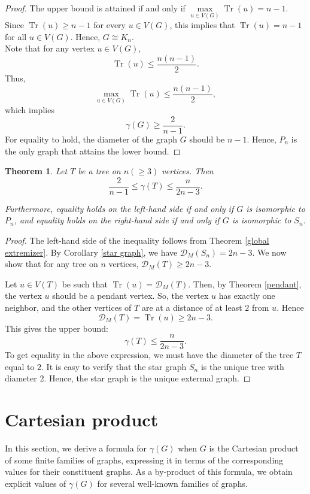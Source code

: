 \documentclass[12pt]{article}
\newtheorem{theorem}{Theorem}[section]
\DeclareMathOperator{\tr}{Tr}
\begin{document}
{{\begin{proof}
				The upper bound is attained if and only if $\max\limits_{u\in V(G)} \tr(u)=n-1$. Since $\tr(u) \geq n-1$ for every $u \in V(G)$, this implies that $\tr(u) = n-1$ for all $u \in V(G)$. Hence, $G \cong K_n$.\\
				Note that for any vertex $u \in V(G)$,
				$$
				\tr(u) \leq \frac{n(n-1)}{2}.
				$$
				Thus, $$\max\limits_{u \in V(G)} \tr(u) \leq \frac{n(n-1)}{2},$$ which implies  $$\gamma(G) \geq \frac{2}{n-1}.$$
				For equality to hold, the diameter of the graph $G$ should be $n-1$. Hence, $P_n$ is the only graph that attains the lower bound.
			\end{proof}
			
			\begin{theorem}
				Let $T$ be a tree on $n(\geq 3)$ vertices.
				Then 
				$$\frac{2}{n-1} \leq \gamma(T) \leq \frac{n}{2n-3}.$$
				
				Furthermore,  equality holds on the left-hand side if and only if  $G$ is isomorphic to $P_n$, and equality holds on the right-hand side if and only if  $G$ is isomorphic to $S_n$.
			\end{theorem}
			\begin{proof}
				The left-hand side of the inequality follows from Theorem \ref{global extremizer}. By Corollary \ref{star graph}, we have $\mathcal{D}_M(S_n)=2n-3$. We now show that for any tree on $n$ vertices, $\mathcal{D}_M(T) \geq 2n-3$. 
				
				Let $u \in V(T)$ be such that $\tr(u)=\mathcal{D}_M(T)$. Then, by Theorem \ref{pendant}, the vertex $u$ should be a pendant vertex. So, the vertex $u$ has exactly one neighbor, and the other vertices of $T$ are at a distance of at least $2$ from $u$. Hence
				$$
				\mathcal{D}_M(T)=\tr(u)\geq 2n-3.
				$$
				This gives the upper bound: $$\gamma (T) \leq \frac{n}{2n-3}.$$
				To get equality in the above expression, we must have the diameter of the tree $T$ equal to $2$. It is easy to verify that the star graph $S_n$ is the unique tree with diameter $2$. Hence, the star graph is the unique extermal graph.
			\end{proof}
			\section{Cartesian product}\label{sec-product}
			
			
			In this section, we derive a formula for $\gamma(G)$ when $G$ is the Cartesian product of some finite families of graphs, expressing it in terms of the corresponding values for their constituent graphs. As a by-product of this formula, we obtain explicit values of $\gamma(G)$ for several well-known families of graphs.
			
}}
\end{document}
